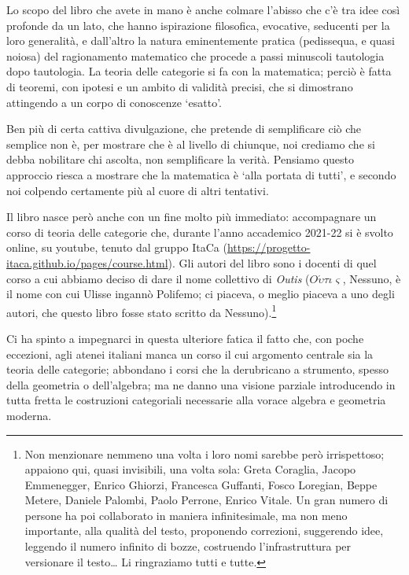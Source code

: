 \medskip
Lo scopo del libro che avete in mano è anche colmare l'abisso che c'è tra idee così profonde da un lato, che hanno ispirazione filosofica, evocative, seducenti per la loro generalità, e dall'altro la natura eminentemente pratica (pedissequa, e quasi noiosa) del ragionamento matematico che procede a passi minuscoli tautologia dopo tautologia. La teoria delle categorie si fa con la matematica; perciò è fatta di teoremi, con ipotesi e un ambito di validità precisi, che si dimostrano attingendo a un corpo di conoscenze `esatto'.

Ben più di certa cattiva divulgazione, che pretende di semplificare ciò che semplice non è, per mostrare che è al livello di chiunque, noi crediamo che si debba nobilitare chi ascolta, non semplificare la verità. Pensiamo questo approccio riesca a mostrare che la matematica è `alla portata di tutti', e secondo noi colpendo certamente più al cuore di altri tentativi.

\medskip
Il libro nasce però anche con un fine molto più immediato: accompagnare un corso di teoria delle categorie che, durante l'anno accademico 2021-22 si è svolto online, su youtube, tenuto dal gruppo ItaCa (\url{https://progetto-itaca.github.io/pages/course.html}). Gli autori del libro sono i docenti di quel corso a cui abbiamo deciso di dare il nome collettivo di \emph{Outis} (\(O \acute\upsilon\tau\iota\varsigma\), Nessuno, è il nome con cui Ulisse ingannò Polifemo; ci piaceva, o meglio piaceva a uno degli autori, che questo libro fosse stato scritto da Nessuno).\footnote{Non menzionare nemmeno una volta i loro nomi sarebbe però irrispettoso; appaiono qui, quasi invisibili, una volta sola:
	Greta Coraglia, Jacopo Emmenegger, Enrico Ghiorzi, Francesca Guffanti, Fosco Loregian, Beppe Metere, Daniele Palombi, Paolo Perrone, Enrico Vitale. Un gran numero di persone ha poi collaborato in maniera infinitesimale, ma non meno importante, alla qualità del testo, proponendo correzioni, suggerendo idee, leggendo il numero infinito di bozze, costruendo l'infrastruttura per versionare il testo\dots{} Li ringraziamo tutti e tutte.}

Ci ha spinto a impegnarci in questa ulteriore fatica il fatto che, con poche eccezioni, agli atenei italiani manca un corso il cui argomento centrale sia la teoria delle categorie; abbondano i corsi che la derubricano a strumento, spesso della geometria o dell'algebra; ma ne danno una visione parziale introducendo in tutta fretta le costruzioni categoriali necessarie alla vorace algebra e geometria moderna.

